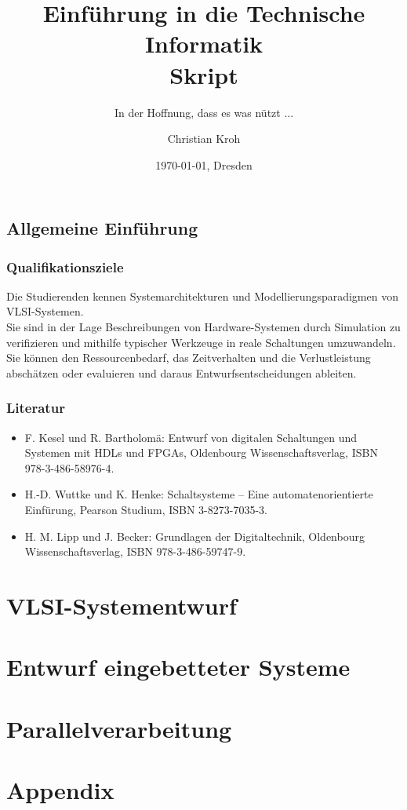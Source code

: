 \documentclass[10pt,german,a4paper]{scrreprt}
\title{Einführung in die Technische Informatik\\Skript}
\subtitle{In der Hoffnung, dass es was nützt ...}
\author{Christian Kroh}
\date{\today{}, Dresden}
\def \Path {/media/Daten/Studium/Skripte/TechnischeInformatik}
\begin{document}
\maketitle
\newpage
\tableofcontents
\newpage

\chapter{Allgemeine Einführung}
\section{Qualifikationsziele}
Die Studierenden kennen Systemarchitekturen und Modellierungsparadigmen
von VLSI-Systemen.\\
Sie sind in der Lage Beschreibungen von Hardware-Systemen durch
Simulation zu verifizieren und mithilfe typischer Werkzeuge in reale
Schaltungen umzuwandeln.\\
Sie können den Ressourcenbedarf, das Zeitverhalten und die Verlustleistung abschätzen oder evaluieren und daraus Entwurfsentscheidungen ableiten.
\section{Literatur}
\begin{itemize}
\item F. Kesel und R. Bartholomä: Entwurf von digitalen Schaltungen und
	Systemen mit HDLs und FPGAs, Oldenbourg Wissenschaftsverlag,
	ISBN 978-3-486-58976-4.
\item H.-D. Wuttke und K. Henke: Schaltsysteme – Eine automatenorientierte
	Einfürung, Pearson Studium, ISBN 3-8273-7035-3.
\item H. M. Lipp und J. Becker: Grundlagen der Digitaltechnik,
Oldenbourg Wissenschaftsverlag, ISBN 978-3-486-59747-9.

\end{itemize}



\newpage
\part{VLSI-Systementwurf}
\newpage


\part{Entwurf eingebetteter Systeme}
\newpage
%


\part{Parallelverarbeitung}
\newpage
%

\part{Appendix}
\newpage

\end{document}
